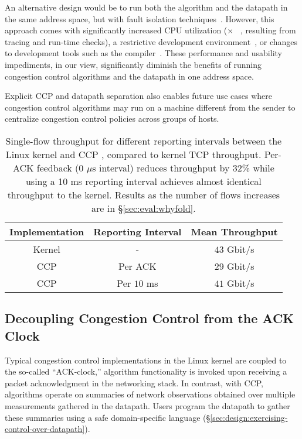 An alternative design would be to run both the algorithm and the datapath in the same address space, but with fault isolation techniques~\cite{sfi, xfi, bgi, lxfi, nacl, janus, systrace}. 
However, this approach comes with significantly increased CPU utilization ($\times$ ~\cite{lxfi, sfi, bgi, janus, systrace}, resulting from tracing and run-time checks), a restrictive development environment~\cite{nacl}, or changes to development tools such as the compiler~\cite{xfi, sfi}.
These performance and usability impediments, in our view, significantly diminish the benefits of running congestion control algorithms and the datapath in one address space.

Explicit CCP and datapath separation also enables future use cases where
congestion control algorithms may run on a machine different from the sender to
centralize congestion control policies across groups of hosts.

\begin{table}[t]
    \centering
    \begin{tabular}{c|c|c}
        Implementation & Reporting Interval & Mean Throughput \\
        \hline
        Kernel & - & $43$ Gbit/s \\
        CCP & Per ACK & $29$ Gbit/s \\
        CCP & Per $10$ ms & $41$ Gbit/s \\
    \end{tabular}
    \caption{Single-flow throughput for different reporting intervals between
      the Linux kernel and CCP \userspace, compared to kernel TCP
      throughput. Per-ACK feedback (0 $\mu$s interval) reduces throughput by
      32\% while using a 10 ms reporting interval
      achieves almost identical throughput to the kernel. Results as the number
      of flows  increases are in
      \S\ref{sec:eval:whyfold}.}\label{tab:perf:interval}
      \vspace{-10pt}
\end{table}

\subsection{Decoupling Congestion Control from the ACK Clock}
\label{sec:design:decoupling-cc-from-ack-clock}

Typical congestion control implementations in the Linux kernel are coupled to the so-called ``ACK-clock,'' \ie algorithm functionality is invoked upon receiving a packet acknowledgment in the networking stack.
In contrast, with CCP, algorithms operate on summaries of network observations obtained over multiple measurements gathered in the datapath.
Users program the datapath to gather these summaries using a safe domain-specific language (\S\ref{sec:design:exercising-control-over-datapath}).


